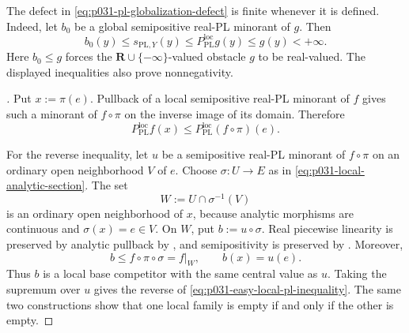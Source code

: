 
The defect in \eqref{eq:p031-pl-globalization-defect} is finite whenever it
is defined.  Indeed, let $b_0$ be a global semipositive real-PL minorant of
$g$.  Then
\[
 b_0(y)\leq s_{\mathrm{PL},Y}(y)
   \leq P_{\mathrm{PL}}^{\mathrm{loc}}g(y)
   \leq g(y)<+\infty.
\]
Here $b_0\leq g$ forces the $\mathbf R\cup\{-\infty\}$-valued obstacle
$g$ to be real-valued.  The displayed inequalities also prove
nonnegativity.

\begin{proof}[]
Put $x:=\pi(e)$.  Pullback of a local semipositive real-PL minorant of $f$
gives such a minorant of $f\circ\pi$ on the inverse image of its domain.
Therefore
\begin{equation}
\label{eq:p031-easy-local-pl-inequality}
 P_{\mathrm{PL}}^{\mathrm{loc}}f(x)
    \leq P_{\mathrm{PL}}^{\mathrm{loc}}(f\circ\pi)(e).
\end{equation}

For the reverse inequality, let $u$ be a semipositive real-PL minorant of
$f\circ\pi$ on an ordinary open neighborhood $V$ of $e$.  Choose
$\sigma:U\to E$ as in \eqref{eq:p031-local-analytic-section}.  The set
\[
                         W:=U\cap\sigma^{-1}(V)
\]
is an ordinary open neighborhood of $x$, because analytic morphisms are
continuous and $\sigma(x)=e\in V$.  On $W$, put $b:=u\circ\sigma$.
Real piecewise linearity is preserved by analytic pullback by
\cite[Lemma~5.4\textup{(1)}, p.~171]{GJR26}, and semipositivity is
preserved by
\cite[Proposition~7.6\textup{(1)}, p.~189]{GJR26}.  Moreover,
\[
 b\leq f\circ\pi\circ\sigma=f|_W,
 \qquad
 b(x)=u(e).
\]
Thus $b$ is a local base competitor with the same central value as $u$.
Taking the supremum over $u$ gives the reverse of
\eqref{eq:p031-easy-local-pl-inequality}.  The same two constructions show
that one local family is empty if and only if the other is empty.
\end{proof}

